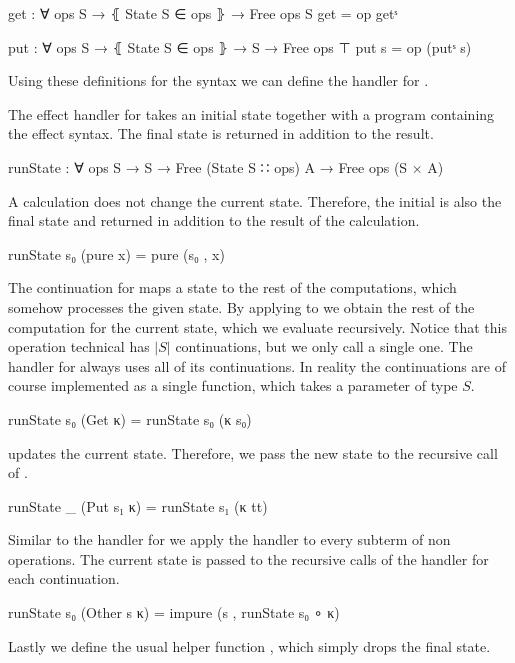 \begin{code}
get : ∀ {ops S} → ⦃ State S ∈ ops ⦄ → Free ops S
get = op getˢ

put : ∀ {ops S} → ⦃ State S ∈ ops ⦄ → S → Free ops ⊤
put s = op (putˢ s)
\end{code}
Using these definitions for the syntax we can define the handler for
.

\begin{AgdaAlign}
The effect handler for  takes an initial state together
with a program containing the effect syntax.
The final state is returned in addition to the result.

\begin{code}
runState : ∀ {ops S} → S → Free (State S ∷ ops) A → Free ops (S × A)
\end{code}
A  calculation does not change the current state.
Therefore, the initial is also the final state and returned in addition to the
result of the calculation.
\begin{code}
runState s₀ (pure x)     = pure (s₀ , x)
\end{code}
The continuation for  maps a state to the rest of the
computations, which somehow processes the given state.
By applying  to  we obtain the rest of the
computation for the current state, which we evaluate recursively.
Notice that this operation technical has $|S|$ continuations, but we only call a
single one.
The handler for  always uses all of its continuations.
In reality the continuations are of course implemented as a single function,
which takes a parameter of type $S$.
\begin{code}
runState s₀ (Get κ)      = runState s₀ (κ s₀)
\end{code}
 updates the current state.
Therefore, we pass the new state  to the recursive call of
.
\begin{code}
runState _  (Put s₁ κ)   = runState s₁ (κ tt)
\end{code}
Similar to the handler for  we apply the handler to every
subterm of non  operations.
The current state is passed to the recursive calls of the handler for each
continuation.
\begin{code}
runState s₀ (Other s κ)  = impure (s , runState s₀ ∘ κ)
\end{code}
\end{AgdaAlign}
Lastly we define the usual helper function , which
simply drops the final state.


